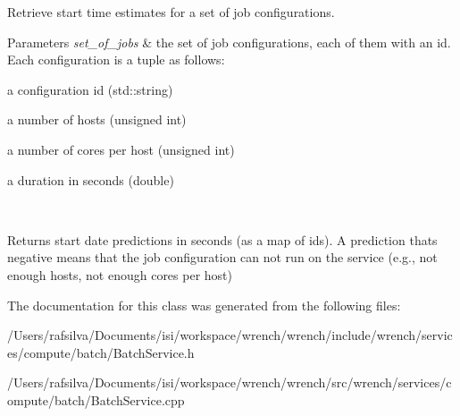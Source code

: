 Retrieve start time estimates for a set of job configurations. 


\begin{DoxyParams}{Parameters}
{\em set\+\_\+of\+\_\+jobs} & the set of job configurations, each of them with an id. Each configuration is a tuple as follows\+:
\begin{DoxyItemize}
\item a configuration id (std\+::string)
\item a number of hosts (unsigned int)
\item a number of cores per host (unsigned int)
\item a duration in seconds (double) 
\end{DoxyItemize}\\
\hline
\end{DoxyParams}
\begin{DoxyReturn}{Returns}
start date predictions in seconds (as a map of ids). A prediction that\textquotesingle{}s negative means that the job configuration can not run on the service (e.\+g., not enough hosts, not enough cores per host) 
\end{DoxyReturn}


The documentation for this class was generated from the following files\+:\begin{DoxyCompactItemize}
\item 
/\+Users/rafsilva/\+Documents/isi/workspace/wrench/wrench/include/wrench/services/compute/batch/Batch\+Service.\+h\item 
/\+Users/rafsilva/\+Documents/isi/workspace/wrench/wrench/src/wrench/services/compute/batch/Batch\+Service.\+cpp\end{DoxyCompactItemize}
